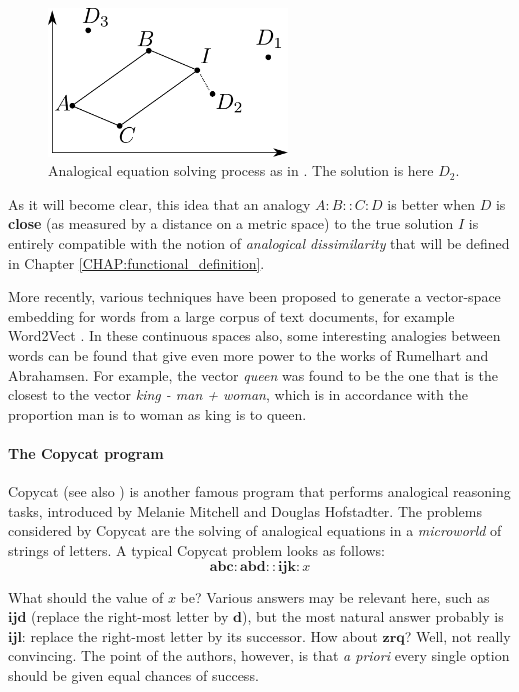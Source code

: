 \begin{figure}[!h]
\centering
\includegraphics[width=2.5in]{figures/rumelhart_model.pdf}
  \caption{Analogical equation solving process as in \cite{RumAbr73}. The
  solution is here $D_2$.}
\label{FIG:rumelhart_model}
\end{figure}

As it will become clear, this idea that an analogy $A:B::C:D$ is better when
$D$ is \textbf{close} (as measured by a distance on a metric space) to the true
solution $I$ is entirely compatible with the notion of \textit{analogical
dissimilarity} that will be defined in Chapter \ref{CHAP:functional_definition}.

More recently, various techniques have been proposed to generate a vector-space
embedding for words from a large corpus of text documents, for example
Word2Vect \cite{MikCheCorDea13}. In these continuous spaces also, some
interesting analogies between words can be found that give even more power to
the works of Rumelhart and Abrahamsen. For example, the vector
\textit{queen} was found to be the one that is the closest to the vector
\textit{king - man + woman}, which is in accordance with the proportion man is
to woman as king is to queen.

\paragraph{The Copycat program\\}

Copycat \cite{Mit93} (see also \cite{HofMit94}) is another famous program that
performs analogical reasoning tasks, introduced by Melanie Mitchell and Douglas
Hofstadter. The problems considered by Copycat are the solving of analogical
equations in a \textit{microworld} of strings of letters. A typical Copycat
problem looks as follows: $$\mathbf{abc} : \mathbf{abd} :: \mathbf{ijk} : x$$

What should the value of $x$ be? Various answers may be relevant here, such as
$\mathbf{ijd}$ (replace the right-most letter by $\mathbf{d}$), but the most
natural answer probably is $\mathbf{ijl}$: replace the right-most letter by its
successor. How about $\mathbf{zrq}$? Well, not really convincing. The point of
the authors, however, is that \textit{a priori} every single option should be
given equal chances of success.

